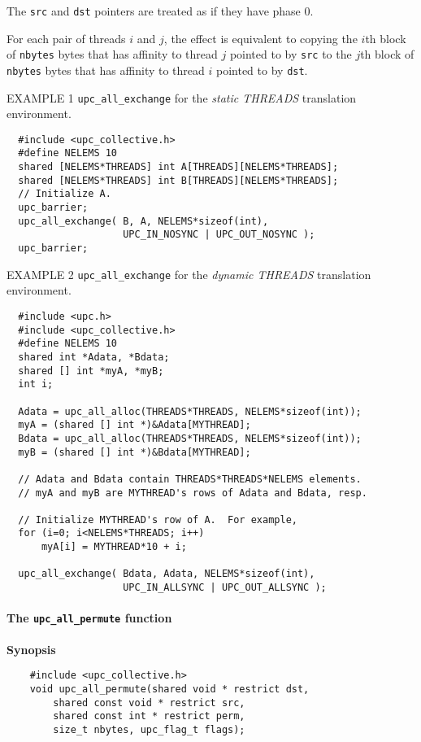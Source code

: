 \np The {\tt src} and {\tt dst} pointers are treated as
if they have phase 0.

\np For each pair of threads $i$ and $j$, the effect is equivalent to copying
the $i$th block of {\tt nbytes} bytes that has affinity to thread $j$
pointed to by {\tt src}
to
the $j$th block of {\tt nbytes} bytes that has affinity to thread $i$ 
pointed to by {\tt dst}.

\np EXAMPLE 1 {\tt upc\_all\_exchange} for the {\em static THREADS}
translation environment.

\begin{verbatim}
  #include <upc_collective.h>
  #define NELEMS 10
  shared [NELEMS*THREADS] int A[THREADS][NELEMS*THREADS];
  shared [NELEMS*THREADS] int B[THREADS][NELEMS*THREADS];
  // Initialize A.
  upc_barrier;
  upc_all_exchange( B, A, NELEMS*sizeof(int),
                    UPC_IN_NOSYNC | UPC_OUT_NOSYNC );
  upc_barrier;
\end{verbatim}

\np EXAMPLE 2 {\tt upc\_all\_exchange} for the {\em dynamic THREADS}
translation environment.

\begin{verbatim}
  #include <upc.h>
  #include <upc_collective.h>
  #define NELEMS 10
  shared int *Adata, *Bdata;
  shared [] int *myA, *myB;
  int i;

  Adata = upc_all_alloc(THREADS*THREADS, NELEMS*sizeof(int));
  myA = (shared [] int *)&Adata[MYTHREAD];
  Bdata = upc_all_alloc(THREADS*THREADS, NELEMS*sizeof(int));
  myB = (shared [] int *)&Bdata[MYTHREAD];

  // Adata and Bdata contain THREADS*THREADS*NELEMS elements.
  // myA and myB are MYTHREAD's rows of Adata and Bdata, resp.

  // Initialize MYTHREAD's row of A.  For example,
  for (i=0; i<NELEMS*THREADS; i++)
      myA[i] = MYTHREAD*10 + i;

  upc_all_exchange( Bdata, Adata, NELEMS*sizeof(int),
                    UPC_IN_ALLSYNC | UPC_OUT_ALLSYNC );
\end{verbatim}

\paragraph{The {\tt upc\_all\_permute} function}

{\bf Synopsis} 

\npf\vspace{-2.5em}
\begin{verbatim}
    #include <upc_collective.h>
    void upc_all_permute(shared void * restrict dst,
        shared const void * restrict src, 
        shared const int * restrict perm,
        size_t nbytes, upc_flag_t flags);
\end{verbatim}

